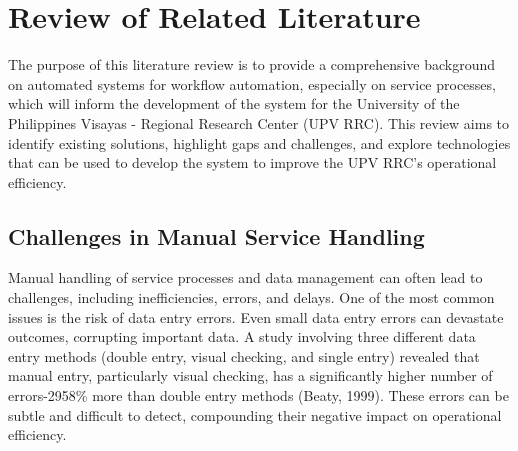 \chapter{Review of Related Literature}
\label{sec:relatedlit}

The purpose of this literature review is to provide a comprehensive background on automated systems for workflow automation, especially on service processes, which will inform the development of the system for the University of the Philippines Visayas - Regional Research Center (UPV RRC). This review aims to identify existing solutions, highlight gaps and challenges, and explore technologies that can be used to develop the system to improve the UPV RRC’s operational efficiency.

\begin{comment}

%
%
Guide on Writing your RRL chapter
 
1. Identify the keywords with respect to your research
      One keyword = One document section
                Examples: 2.1 Story Generation Systems
			 2.2 Knowledge Representation

2.  Find references using these keywords

3.  For each of the references that you find,
        Check: Is it relevant to your research?
        Use their references to find more relevant works.

4. Identify a set of criteria for comparison.
       It will serve as a guide to help you focus on what to look for

5. Write a summary focusing on -
       What: A short description of the work
       How: A summary of the approach it utilized
       Findings: If applicable, provide the results
        Why: Relevance to your work

6. At the end of each section,  show a Table of Comparison of the related works 
   and your proposed project/system

\end{comment}

\section{Challenges in Manual Service Handling}

Manual handling of service processes and data management can often lead to challenges, including inefficiencies, errors, and delays. One of the most common issues is the risk of data entry errors. Even small data entry errors can devastate outcomes, corrupting important data. A study involving three different data entry methods (double entry, visual checking, and single entry) revealed that manual entry, particularly visual checking, has a significantly higher number of errors-2958\% more than double entry methods (Beaty, 1999). These errors can be subtle and difficult to detect, compounding their negative impact on operational efficiency. 

